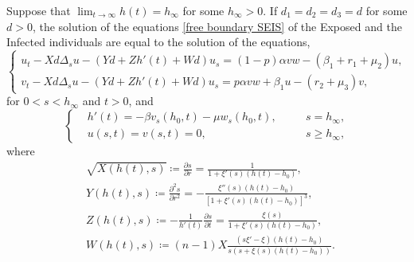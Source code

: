 \documentclass[10pt,a4paper]{amsart}
\begin{document}
\begin{lemma} \label{equation changing}
Suppose that $\displaystyle \lim _{t \to \infty}h(t)=h_\infty$ for some $h_\infty >0$. If $d_1=d_2=d_3=d$ for some $d>0$, the solution of the equations \cref{free boundary SEIS} of the Exposed and the Infected individuals are equal to the solution of the equations,
\begin{equation} \label{modified free boundary SEIS4}
	\left \{ \begin{aligned}
		u_t-Xd\Delta_s u-(Yd+Zh'(t)+Wd)u_s=(1-p)\alpha vw-(\beta_1+r_1+\mu_2)u,\\
		v_t-Xd\Delta_s u-(Yd+Zh'(t)+Wd)u_s=p\alpha vw+\beta_1 u-(r_2+\mu_3)v,
	\end{aligned} \right.
\end{equation}
for $0<s<h_\infty$ and $t>0$, and
\begin{equation} \label{modified free boundary SEIS4 cond}
	\left \{ \begin{aligned}
		&h'(t)=-\beta v_s(h_0,t)-\mu w_s(h_0,t), \quad &&s=h_\infty,\\
		&u(s,t)=v(s,t)=0, &&s\geq h_\infty,
	\end{aligned} \right.
\end{equation}
where
\begin{equation*}
	\begin{aligned}
		&\sqrt{X(h(t),s)}\coloneqq \frac{\partial s}{\partial r}=\frac{1}{1+\xi'(s)(h(t)-h_0)},
			\\
		&Y(h(t),s)\coloneqq \frac{\partial^2s}{\partial r^2}=-\frac{\xi''(s)(h(t)-h_0)}{[1+\xi'(s)(h(t)-h_0)]^3},
			\\
		&Z(h(t),s)\coloneqq -\frac{1}{h'(t)}\frac{\partial s}{\partial t}=\frac{\xi(s)}{1+\xi'(s)(h(t)-h_0)},
			\\
		&W(h(t),s)\coloneqq(n-1)X\frac{(s\xi'-\xi)(h(t)-h_0)}{s(s+\xi(s)(h(t)-h_0))}.\,
	\end{aligned}
\end{equation*}
\end{lemma}
\end{document}
